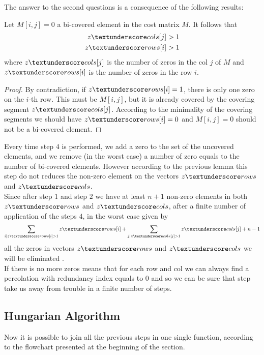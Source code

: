 \documentclass[12pt]{ClasseMatematicamente}
\begin{document}
The answer to the second questions is a consequence of the following results:
\begin{lemma}
 Let $M[i,j] = 0$ a bi-covered element in the cost matrix $M$. It follows that
 \begin{align*}
  z\textunderscore cols[j] > 1 \\ 
  z\textunderscore rows[i] > 1
 \end{align*}
 where $z\textunderscore cols[j]$ is the number of zeros in the col $j$ of $M$ and $z\textunderscore rows[i]$ is the number of zeros in the row $i$.
\end{lemma}
\begin{proof}
 By contradiction, if $z\textunderscore rows[i] =  1$, there is only one zero on the $i$-th row. This must be $M[i,j]$, but it is already covered by the covering segment $z\textunderscore cols[j]$. According to the minimality of the covering segments we should have $z\textunderscore rows[i] = 0$ and $M[i,j] = 0$ should not be a bi-covered element.  
\end{proof}
Every time step $4$ is performed, we add a zero to the set of the uncovered elements, and we remove (in the worst case) a number of zero equals to the number of bi-covered elements. However according to the previous lemma this step do not reduces the non-zero element on the vectors $z\textunderscore rows$ and $z\textunderscore cols$. \\
Since after step $1$ and step $2$ we have at least $n+1$ non-zero elements in both $z\textunderscore rows$ and $z\textunderscore cols$, after a finite number of application of the steps $4$, in the worst case given by 
\begin{align*}
\sum_{i \mid z\textunderscore rows[i]>1} z\textunderscore rows[i] 
+
\sum_{j \mid z\textunderscore cols[j]>1} z\textunderscore cols[j]
+n-1
\end{align*}
all the zeros in vectors $z\textunderscore rows$ and $z\textunderscore cols$ we will be eliminated .\\ 
If there is no more zeros means that for each row and col we can always find a percolation with redundancy index equals to $0$ and so we can be sure that step take us away from trouble in a finite number of steps.
\subsection*{Hungarian Algorithm}
Now it is possible to join all the previous steps in one single function, according to the flowchart presented at the beginning of the section.
\end{document}
